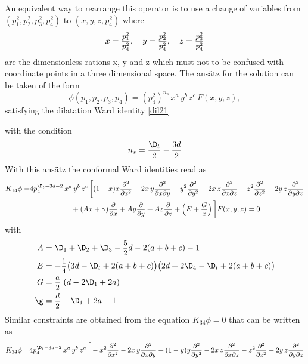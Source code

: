 \documentclass[a4paper,11pt,openright,twoside]{book}
\newcommand{\sdfrac}[2]{\mbox{\small$\displaystyle\frac{#1}{#2}$}}
\numberwithin{equation}{section}
\begin{document}
{{	An equivalent way to rearrange this operator is to use a change of variables from $(p_1^2,p_2^2,p_3^2,p_4^2)$ to $(x,y,z,p_4^2)$ where 
	\begin{equation}
		x=\sdfrac{p_1^2}{p_4^2},\quad y=\sdfrac{p_2^2}{p_4^2},\quad z=\sdfrac{p_3^2}{p_4^2}
	\end{equation}
	are the dimensionless rations x, y and z which must not to be confused with coordinate points in a three dimensional space. The ans\"atz for the solution can be taken of the form
	\begin{equation}
		\phi(p_1,p_2,p_3,p_4)=(p_4^2)^{n_s}\,x^a\,y^b\,z^c\,F(x,y,z),
	\end{equation}
	satisfying the dilatation Ward identity \eqref{dil21}
	
	with the condition
	\begin{equation}
		n_s=\frac{\D_t}{2}-\frac{3d}{2}
	\end{equation}
	With this ans\"atz the conformal Ward identities read as
	\begin{align}
		K_{14}\phi=&4p_4^{\D_t-3d-2}\,x^a\,y^b\,z^c\,\bigg[(1-x)x\sdfrac{\partial^2}{\partial x^2}-2x\,y\sdfrac{\partial^2}{\partial x\partial y}-y^2\sdfrac{\partial^2}{\partial y^2}-2x\,z\sdfrac{\partial^2}{\partial x\partial z}-z^2\sdfrac{\partial^2}{\partial z^2}-2y\,z\sdfrac{\partial^2}{\partial y\partial z}\notag\\
		&\hspace{2cm}+(Ax+\gamma)\sdfrac{\partial}{\partial x}+Ay\sdfrac{\partial}{\partial y}+Az\sdfrac{\partial }{\partial z}+\left(E+\sdfrac{G}{x}\right)\bigg]F(x,y,z)=0
	\end{align}
	with
	\begin{subequations}
		\begin{align}
			A&=\D_1+\D_2+\D_3-\sdfrac{5}{2}d-2(a+b+c)-1\\
			E&=-\sdfrac{1}{4}\big(3d-\D_t+2(a+b+c)\big)\big(2d+2\D_4-\D_t+2(a+b+c)\big)\\
			G&=\sdfrac{a}{2}\,\left(d-2\D_1+2a\right)\\
			\g&=\sdfrac{d}{2}-\D_1+2a+1
		\end{align}
	\end{subequations}
	Similar constraints are obtained from the equation $K_{34}\phi=0$ that can be written as
	\begin{align}
		{K}_{24}\phi=&4p_4^{\D_t-3d-2}\,x^a\,y^b\,z^c\,\bigg[-x^2\sdfrac{\partial^2}{\partial x^2}-2x\,y\sdfrac{\partial^2}{\partial x\partial y}+(1-y)y\sdfrac{\partial^2}{\partial y^2}-2x\,z\sdfrac{\partial^2}{\partial x\partial z}-z^2\sdfrac{\partial^2}{\partial z^2}-2y\,z\sdfrac{\partial^2}{\partial y\partial z}\notag\\

\end{align}}}
\end{document}
